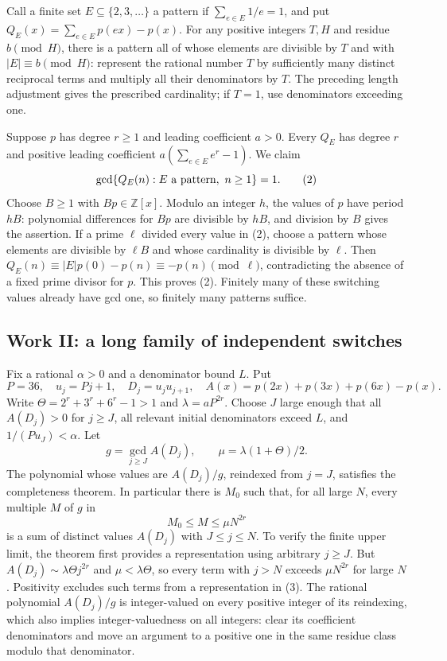 Call a finite set $E\subseteq\{2,3,\ldots\}$ a pattern if $\sum_{e\in E}1/e=1$, and put
$Q_E(x)=\sum_{e\in E}p(ex)-p(x)$. For any positive integers $T,H$ and residue $b\pmod H$, there is a pattern all of whose elements are divisible by $T$ and with $|E|\equiv b\pmod H$: represent the rational number $T$ by sufficiently many distinct reciprocal terms and multiply all their denominators by $T$. The preceding length adjustment gives the prescribed cardinality; if $T=1$, use denominators exceeding one.

Suppose $p$ has degree $r\ge1$ and leading coefficient $a>0$. Every $Q_E$ has degree $r$ and positive leading coefficient $a(\sum_{e\in E}e^r-1)$. We claim
\[
 \gcd\{Q_E(n):E\hbox{ a pattern},\ n\ge1\}=1.
 \tag{2}
\]
Choose $B\ge1$ with $Bp\in\mathbb Z[x]$. Modulo an integer $h$, the values of $p$ have period $hB$: polynomial differences for $Bp$ are divisible by $hB$, and division by $B$ gives the assertion. If a prime $\ell$ divided every value in (2), choose a pattern whose elements are divisible by $\ell B$ and whose cardinality is divisible by $\ell$. Then
$Q_E(n)\equiv|E|p(0)-p(n)\equiv-p(n)\pmod\ell$, contradicting the absence of a fixed prime divisor for $p$. This proves (2). Finitely many of these switching values already have gcd one, so finitely many patterns suffice.

\subsection{Work II: a long family of independent switches}
Fix a rational $\alpha>0$ and a denominator bound $L$. Put
\[
 P=36,\quad u_j=Pj+1,\quad D_j=u_ju_{j+1},\quad
 A(x)=p(2x)+p(3x)+p(6x)-p(x).
\]
Write $\Theta=2^r+3^r+6^r-1>1$ and $\lambda=aP^{2r}$. Choose $J$ large enough that all $A(D_j)>0$ for $j\ge J$, all relevant initial denominators exceed $L$, and $1/(Pu_J)<\alpha$. Let
\[
 g=\gcd_{j\ge J}A(D_j),\qquad
 \mu=\lambda(1+\Theta)/2.
\]
The polynomial whose values are $A(D_j)/g$, reindexed from $j=J$, satisfies the completeness theorem. In particular there is $M_0$ such that, for all large $N$, every multiple $M$ of $g$ in
\[
 M_0\le M\le\mu N^{2r}
 \tag{3}
\]
is a sum of distinct values $A(D_j)$ with $J\le j\le N$. To verify the finite upper limit, the theorem first provides a representation using arbitrary $j\ge J$. But
$A(D_j)\sim\lambda\Theta j^{2r}$ and $\mu<\lambda\Theta$, so every term with $j>N$ exceeds $\mu N^{2r}$ for large $N$. Positivity excludes such terms from a representation in (3). The rational polynomial $A(D_j)/g$ is integer-valued on every positive integer of its reindexing, which also implies integer-valuedness on all integers: clear its coefficient denominators and move an argument to a positive one in the same residue class modulo that denominator.

